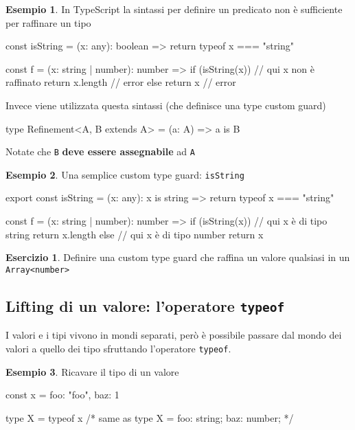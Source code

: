 \documentclass[12pt]{article}
\theoremstyle{definition}
\newtheorem{example}{Esempio}[subsection]
\newtheorem{exercise}{Esercizio}[subsection]
\newenvironment{code}
  {\vspace{0.5cm} \VerbatimEnvironment\begin{typescriptcode}}
  {\end{typescriptcode} \vspace{0.2cm}}
\begin{document}
\begin{example}
In TypeScript la sintassi per definire un predicato non è sufficiente per raffinare un tipo

\begin{code}
const isString = (x: any): boolean => {
  return typeof x === "string"
}

const f = (x: string | number): number => {
  if (isString(x)) {
    // qui x non è raffinato
    return x.length // error
  } else {
    return x // error
  }
}
\end{code}
\end{example}

Invece viene utilizzata questa sintassi (che definisce una type custom guard)

\begin{code}
type Refinement<A, B extends A> = (a: A) => a is B
\end{code}

Notate che \texttt{B} \textbf{deve essere assegnabile} ad \texttt{A}

\begin{example}
Una semplice custom type guard: \texttt{isString}

\begin{code}
export const isString = (x: any): x is string => {
  return typeof x === "string"
}

const f = (x: string | number): number => {
  if (isString(x)) {
    // qui x è di tipo string
    return x.length
  } else {
    // qui x è di tipo number
    return x
  }
}
\end{code}
\end{example}

\begin{exercise}
Definire una custom type guard che raffina un valore qualsiasi in un \texttt{Array<number>}
\end{exercise}

\subsection{Lifting di un valore: l'operatore \texttt{typeof}}

I valori e i tipi vivono in mondi separati, però è possibile passare dal mondo dei valori a quello dei tipo
sfruttando l'operatore \texttt{typeof}.

\begin{example}
Ricavare il tipo di un valore

\begin{code}
const x = {
  foo: "foo",
  baz: 1
}

type X = typeof x
/* same as
type X = {
  foo: string;
  baz: number;
}
*/
\end{code}
\end{example}
\end{document}
